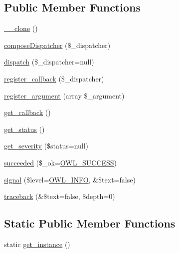 \subsection*{Public Member Functions}
\begin{DoxyCompactItemize}
\item 
\hyperlink{classDispatcher_a601d9fd6c9a2ccbfd77b43b6f7678ba3}{\_\-\_\-clone} ()
\item 
\hyperlink{classDispatcher_a8a974bbbb30be7cda74f9929972fd2f6}{composeDispatcher} (\$\_\-dispatcher)
\item 
\hyperlink{classDispatcher_a55f3a6e89f797e2986d32166cfa49486}{dispatch} (\$\_\-dispatcher=null)
\item 
\hyperlink{classDispatcher_ab466a55a02d5c40d10da035942d55bd5}{register\_\-callback} (\$\_\-dispatcher)
\item 
\hyperlink{classDispatcher_a1542eebbc07bb9bf848c5cbd90cd437e}{register\_\-argument} (array \$\_\-argument)
\item 
\hyperlink{classDispatcher_af4b71fa3c4d25bab86187d9dc44182f2}{get\_\-callback} ()
\item 
\hyperlink{class__OWL_a99ec771fa2c5c279f80152cc09e489a8}{get\_\-status} ()
\item 
\hyperlink{class__OWL_adf9509ef96858be7bdd9414c5ef129aa}{get\_\-severity} (\$status=null)
\item 
\hyperlink{class__OWL_ae76c46aff1ad253106332670fc59c777}{succeeded} (\$\_\-ok=\hyperlink{owl_8severitycodes_8php_a96223f06ba27bf5cbefa6e9d702897c2}{OWL\_\-SUCCESS})
\item 
\hyperlink{class__OWL_a51ba4a16409acf2a2f61f286939091a5}{signal} (\$level=\hyperlink{owl_8severitycodes_8php_a139328861128689f2f4def6a399d9057}{OWL\_\-INFO}, \&\$text=false)
\item 
\hyperlink{class__OWL_aa29547995d6741b7d2b90c1d4ea99a13}{traceback} (\&\$text=false, \$depth=0)
\end{DoxyCompactItemize}
\subsection*{Static Public Member Functions}
\begin{DoxyCompactItemize}
\item 
static \hyperlink{classDispatcher_af9998a41bc9dec229b58924e9d5e5e6a}{get\_\-instance} ()
\end{DoxyCompactItemize}
